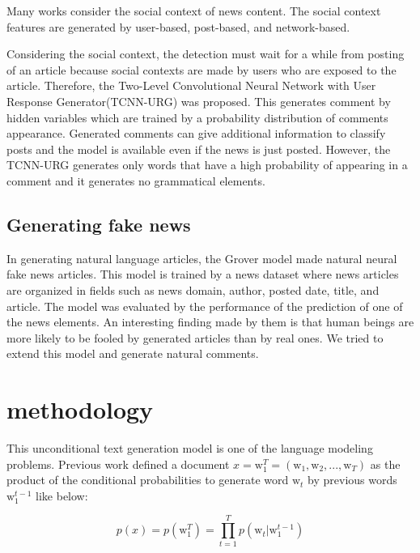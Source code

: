 \documentclass[conference]{IEEEtran}
\begin{document}
Many works consider the social context of news content.
The social context features are generated by user-based\cite{Castillo:2011:ICT:1963405.1963500,8397048,DBLP:journals/corr/abs-1904-13355}, 
post-based\cite{Yang2019UnsupervisedFN,Tacchini2017SomeLI,Jin:2016:NVE:3016100.3016318},
 and network-based\cite{Wu:2018:TFF:3159652.3159677,DBLP:journals/corr/abs-1902-06673}.

Considering the social context, the detection must wait for a while from posting of an article because social contexts are made by users who are exposed to the article.
Therefore, the Two-Level Convolutional Neural Network with User Response Generator(TCNN-URG) was proposed\cite{ijcai2018-533}.
This generates comment by hidden variables which are trained by a probability distribution of comments appearance.
Generated comments can give additional information to classify posts and the model is available even if the news is just posted.
However, the TCNN-URG generates only words that have a high probability of appearing in a comment and it generates no grammatical elements.

\subsection{Generating fake news}
\label{subsec:generate}
In generating natural language articles, the Grover model made natural neural fake news articles\cite{NIPS2019_9106}.
This model is trained by a news dataset where news articles are organized in fields such as news domain, author, posted date, title, and article.
The model was evaluated by the performance of the prediction of one of the news elements.
An interesting finding made by them is that human beings are more likely to be fooled by generated articles than by real ones.
We tried to extend this model and generate natural comments.


\section{methodology}
This unconditional text generation model is one of the language modeling problems.
Previous work\cite{10.5555/944919.944966} defined a document
$x = \mathrm{w}_1^T = (\mathrm{w}_1, \mathrm{w}_2, ..., \mathrm{w}_T)$
as the product of the conditional probabilities to generate word $\mathrm{w}_t$
by previous words $ \mathrm{w}_1^{t-1}$ like below:

\begin{equation}
    \label{eq:generate}
    p(x) = p(\mathrm{w}_1^T) = \prod_{t=1}^{T} p(\mathrm{w}_t|\mathrm{w}_1^{t-1})
\end{equation}
\end{document}
